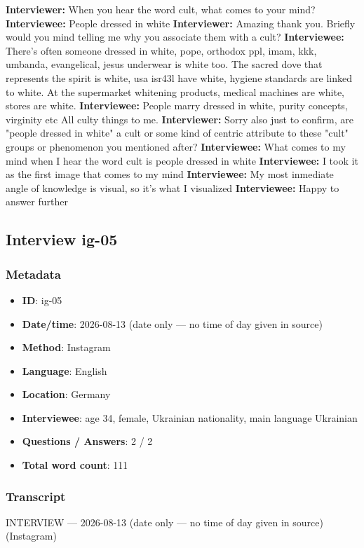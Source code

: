 \textbf{Interviewer:} When you hear the word cult, what comes to your mind?
\textbf{Interviewee:} People dressed in white
\textbf{Interviewer:} Amazing thank you. Briefly would you mind telling me why you associate them with a cult?
\textbf{Interviewee:} There's often someone dressed in white, pope, orthodox ppl, imam, kkk, umbanda, evangelical, jesus underwear is white too. The sacred dove  that represents the spirit is white, usa isr43l have white, hygiene standards are linked to white. At the supermarket whitening products, medical machines are white, stores are white.
\textbf{Interviewee:} People marry dressed in white, purity concepts, virginity etc
All culty things to me.
\textbf{Interviewer:} Sorry also just to confirm, are "people dressed in white"  a cult or some kind of centric attribute to these "cult" groups or phenomenon you mentioned after?
\textbf{Interviewee:} What comes to my mind when I hear the word cult is people dressed in white
\textbf{Interviewee:} I took it as the first image that comes to my mind
\textbf{Interviewee:} My most inmediate angle of knowledge is visual, so it's what I visualized
\textbf{Interviewee:} Happy to answer further

\subsection{Interview ig-05}\label{int:ig-05}
\subsubsection*{Metadata}
\begin{itemize}
  \item \textbf{ID}: ig-05
  \item \textbf{Date/time}: 2026-08-13 (date only — no time of day given in source)
  \item \textbf{Method}: Instagram
  \item \textbf{Language}: English
  \item \textbf{Location}: Germany
  \item \textbf{Interviewee}: age 34, female, Ukrainian nationality, main language Ukrainian
  \item \textbf{Questions / Answers}: 2 / 2
  \item \textbf{Total word count}: 111
\end{itemize}
\subsubsection*{Transcript}
INTERVIEW — 2026-08-13 (date only — no time of day given in source) (Instagram)

